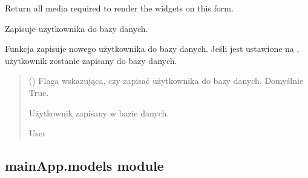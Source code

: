 \documentclass[letterpaper,10pt,polish]{sphinxmanual}
\begin{document}
\begin{fulllineitems}
\begin{fulllineitems}
\label{\detokenize{mainApp:mainApp.forms.UserForm.media}}
\pysigstartsignatures
{}
\pysigstopsignatures
\sphinxAtStartPar
Return all media required to render the widgets on this form.

\end{fulllineitems}


\begin{fulllineitems}
\label{\detokenize{mainApp:mainApp.forms.UserForm.save}}
\pysigstartsignatures
{}
\pysigstopsignatures
\sphinxAtStartPar
Zapisuje użytkownika do bazy danych.

\sphinxAtStartPar
Funkcja  zapisuje nowego użytkownika do bazy danych.
Jeśli  jest ustawione na , użytkownik zostanie zapisany
do bazy danych.
\begin{quote}\begin{description}
\sphinxAtStartPar
{} () \textendash{} Flaga wskazująca, czy zapisać użytkownika do bazy danych. Domyślnie True.

\sphinxAtStartPar
Użytkownik zapisany w bazie danych.

\sphinxAtStartPar
User

\end{description}\end{quote}

\end{fulllineitems}


\end{fulllineitems}



\subsection{mainApp.models module}
\label{\detokenize{mainApp:module-mainApp.models}}\label{\detokenize{mainApp:mainapp-models-module}}
\end{document}
